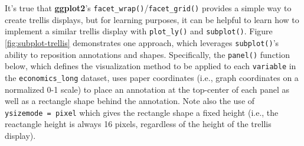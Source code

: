 \documentclass[
  12pt,
]{krantz}
\begin{document}
It's true that \textbf{ggplot2}'s \texttt{facet\_wrap()}/\texttt{facet\_grid()} provides a simple way to create trellis displays, but for learning purposes, it can be helpful to learn how to implement a similar trellis display with \texttt{plot\_ly()} and \texttt{subplot()}. Figure \ref{fig:subplot-trellis} demonstrates one approach, which leverages \texttt{subplot()}'s ability to reposition annotations and shapes. Specifically, the \texttt{panel()} function below, which defines the visualization method to be applied to each \texttt{variable} in the \texttt{economics\_long} dataset, uses paper coordinates (i.e., graph coordinates on a normalized 0-1 scale) to place an annotation at the top-center of each panel as well as a rectangle shape behind the annotation. Note also the use of \texttt{ysizemode\ =\ \textquotesingle{}pixel\textquotesingle{}} which gives the rectangle shape a fixed height (i.e., the reactangle height is always 16 pixels, regardless of the height of the trellis display).
\end{document}
